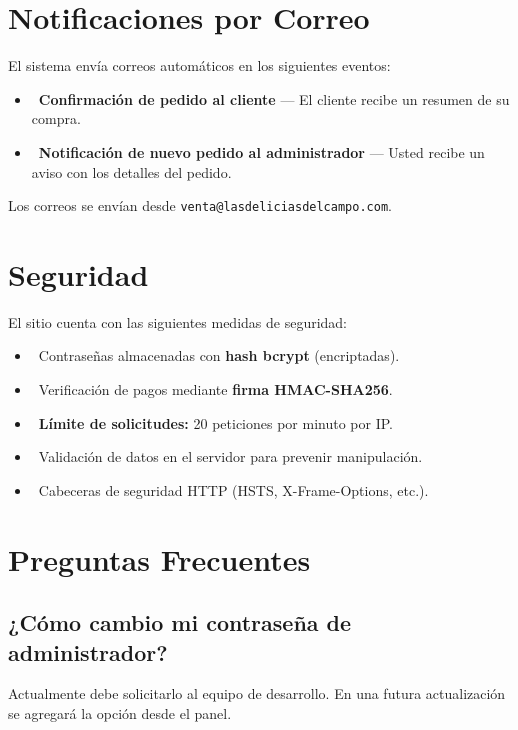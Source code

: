 \documentclass[12pt,a4paper]{article}
\begin{document}
\section{Notificaciones por Correo}

El sistema envía correos automáticos en los siguientes eventos:

\begin{itemize}[leftmargin=2cm]
    \item \faEnvelope\ \textbf{Confirmación de pedido al cliente} --- El cliente recibe un resumen de su compra.
    \item \faBell\ \textbf{Notificación de nuevo pedido al administrador} --- Usted recibe un aviso con los detalles del pedido.
\end{itemize}

Los correos se envían desde \texttt{venta@lasdeliciasdelcampo.com}.

\section{Seguridad}

El sitio cuenta con las siguientes medidas de seguridad:

\begin{itemize}[leftmargin=2cm]
    \item \faLock\ Contraseñas almacenadas con \textbf{hash bcrypt} (encriptadas).
    \item \faShieldAlt\ Verificación de pagos mediante \textbf{firma HMAC-SHA256}.
    \item \faTachometerAlt\ \textbf{Límite de solicitudes:} 20 peticiones por minuto por IP.
    \item \faCheckCircle\ Validación de datos en el servidor para prevenir manipulación.
    \item \faGlobe\ Cabeceras de seguridad HTTP (HSTS, X-Frame-Options, etc.).
\end{itemize}

\section{Preguntas Frecuentes}

\subsection{¿Cómo cambio mi contraseña de administrador?}
Actualmente debe solicitarlo al equipo de desarrollo. En una futura actualización se agregará la opción desde el panel.
\end{document}
